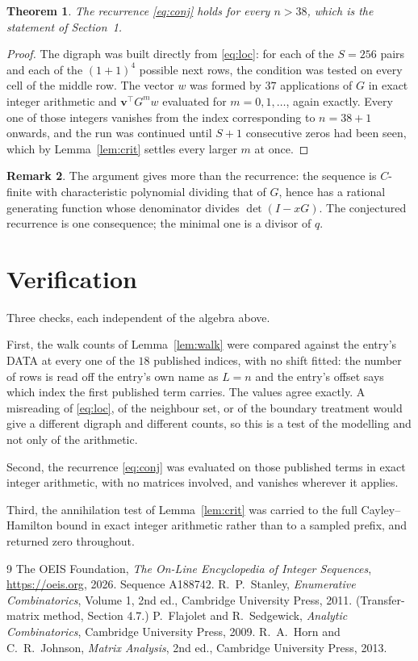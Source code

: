 \documentclass[11pt,a4paper]{article}
\theoremstyle{plain}
\newtheorem{theorem}{Theorem}
\theoremstyle{definition}
\newtheorem{remark}[theorem]{Remark}
\begin{document}
\begin{theorem}
The recurrence \eqref{eq:conj} holds for every $n>38$, which is the statement of
Section~1.
\end{theorem}

\begin{proof}
The digraph was built directly from \eqref{eq:loc}: for each of the $S=256$ pairs and each
of the $(1+1)^{4}$ possible next rows, the condition was tested on every cell of
the middle row. The vector $w$ was formed by $37$ applications of $G$ in exact integer
arithmetic and $\mathbf{v}^{\!\top}G^{m}w$ evaluated for $m=0,1,\dots$, again exactly.
Every one of those integers vanishes from the index corresponding to $n=38+1$ onwards,
and the run was continued until $S+1$ consecutive zeros had been seen, which by
Lemma~\ref{lem:crit} settles every larger $m$ at once.
\end{proof}

\begin{remark}
The argument gives more than the recurrence: the sequence is $C$-finite with characteristic
polynomial dividing that of $G$, hence has a rational generating function whose denominator
divides $\det(I-xG)$. The conjectured recurrence is one consequence; the minimal one is a
divisor of $q$.
\end{remark}

\section{Verification}

Three checks, each independent of the algebra above.

First, the walk counts of Lemma~\ref{lem:walk} were compared against the entry's DATA at
every one of the $18$ published indices, with no shift fitted: the number of rows is
read off the entry's own name as $L=n$ and the entry's offset says which index the first
published term carries. The values agree exactly. A misreading of \eqref{eq:loc}, of the
neighbour set, or of the boundary treatment would give a different digraph and different
counts, so this is a test of the modelling and not only of the arithmetic.

Second, the recurrence \eqref{eq:conj} was evaluated on those published terms in exact
integer arithmetic, with no matrices involved, and vanishes wherever it applies.

Third, the annihilation test of Lemma~\ref{lem:crit} was carried to the full
Cayley--Hamilton bound in exact integer arithmetic rather than to a sampled prefix, and
returned zero throughout.

\begin{thebibliography}{9}
 The OEIS Foundation, \emph{The On-Line Encyclopedia of Integer
Sequences}, \url{https://oeis.org}, 2026. Sequence A188742.
 R.~P.~Stanley, \emph{Enumerative Combinatorics}, Volume 1, 2nd ed.,
Cambridge University Press, 2011. (Transfer-matrix method, Section 4.7.)
 P.~Flajolet and R.~Sedgewick, \emph{Analytic Combinatorics}, Cambridge
University Press, 2009.
 R.~A.~Horn and C.~R.~Johnson, \emph{Matrix Analysis}, 2nd ed., Cambridge
University Press, 2013.
\end{thebibliography}
\end{document}
